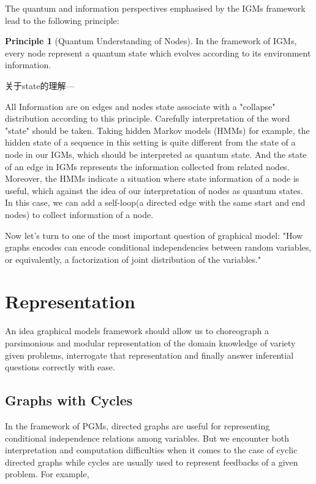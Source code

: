 \documentclass{article}
\theoremstyle{definition}
\theoremstyle{remark}
\theoremstyle{definition}
\newtheorem{principle}[theorem]{Principle}
\begin{document}
\begin{CJK*}{UTF8}{gbsn}
The quantum and information perspectives emphasised by the IGMs framework lead to the following principle:

\begin{principle}[Quantum Understanding of Nodes]
\label{prin:quantum}
In the framework of IGMs, every node represent a quantum state which evolves according to its environment information.
\end{principle}

关于state的理解---

All Information are on edges and nodes state associate with a "collapse" distribution according to this principle. Carefully interpretation of the word "state" should be taken. Taking hidden Markov models (HMMs) for example, the hidden state of a sequence in this setting is quite different from the state of a node in our IGMs, which should be interpreted as quantum state. And the state of an edge in IGMs represents the information collected from related nodes. Moreover, the HMMs indicate a situation where state information of a node is useful, which against the idea of our interpretation of nodes as quantum states. In this case, we can add a self-loop(a directed edge with the same start and end nodes) to collect information of a node.

Now let's turn to one of the most important question of graphical model: "How graphs encodes can encode conditional independencies between random variables, or equivalently, a factorization of joint distribution of the variables."

\section{Representation} \label{sec:repre}


An idea graphical models framework should allow us to choreograph a parsimonious and modular representation of the domain knowledge of variety given problems, interrogate that representation and finally answer inferential questions correctly with ease. 

\subsection{Graphs with Cycles}

In the framework of PGMs, directed graphs are useful for representing conditional independence relations among variables. %
But we encounter both interpretation and computation difficulties when it comes to the case of cyclic directed graphs while cycles are usually used to represent feedbacks of a given problem\cite{bongers2016theoretical}. For example, 


\end{CJK*}
\end{document}
